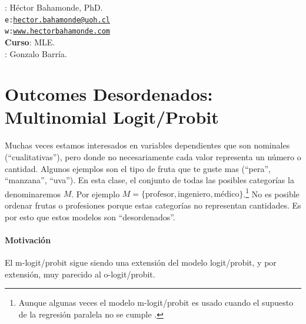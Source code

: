 \documentclass[onesided]{article}\usepackage[]{graphicx}\usepackage[]{color}
\begin{document}











\hspace{-5mm}{\bf Profesor}: H\'ector Bahamonde, PhD.\\
\texttt{e:}\href{mailto:hector.bahamonde@uoh.cl}{\texttt{hector.bahamonde@uoh.cl}}\\
\texttt{w:}\href{http://www.hectorbahamonde.com}{\texttt{www.hectorbahamonde.com}}\\
{\bf Curso}: MLE.\\
\hspace{-5mm}{\bf TA}: Gonzalo Barr\'ia.

\section{Outcomes Desordenados: Multinomial Logit/Probit}

Muchas veces estamos interesados en variables dependientes que son nominales (``cualitativas''), pero donde no necesariamente cada valor representa un n\'umero o cantidad. Algunos ejemplos son el tipo de fruta que te guste mas (``pera'', ``manzana'', ``uva''). En esta clase, el conjunto de todas las posibles categor\'ias la denominaremos $M$. Por ejemplo $M=\{\text{profesor},\text{ingeniero} , \text{m\'edico}\}$.\footnote{Aunque algunas veces el modelo m-logit/probit es usado cuando el supuesto de la regresi\'on paralela no se cumple \parencite[148]{Long:1997wv}.} No es posible ordenar frutas o profesiones porque estas categor\'ias no representan cantidades. Es por esto que estos modelos son ``desordenados''.

\paragraph{Motivaci\'on} El m-logit/probit sigue siendo una extensi\'on del modelo logit/probit, y por extensi\'on, muy parecido al o-logit/probit. 
\end{document}

